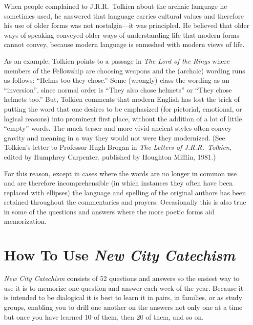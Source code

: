 \documentclass[]{memoir}
\begin{document}
When people complained to J.R.R.\ Tolkien about the archaic language he sometimes used, he answered that language carries cultural values and therefore his use of older forms was not nostalgia\thinspace{}---\thinspace{}it was principled. He believed that older ways of speaking conveyed older ways of understanding life that modern forms cannot convey, because modern language is enmeshed with modern views of life.

As an example, Tolkien points to a passage in \emph{The Lord of the Rings}\/ where members of the Fellowship are choosing weapons and the (archaic) wording runs as follows: ``Helms too they chose.'' Some (wrongly) class the wording as an ``inversion'', since normal order is ``They also chose helmets'' or ``They chose helmets too.'' But, Tolkien comments that modern English has lost the trick of putting the word that one desires to be emphasized (for pictorial, emotional, or logical reasons) into prominent first place, without the addition of a lot of little ``empty'' words. The much terser and more vivid ancient styles often convey gravity and meaning in a way they would not were they modernized. (See Tolkien's letter to Professor Hugh Brogan in \emph{The Letters of J.R.R.\ Tolkien}, edited by Humphrey Carpenter, published by Houghton Mifflin, 1981.)

For this reason, except in cases where the words are no longer in common use and are therefore incomprehensible (in which instances they often have been replaced with ellipses) the language and spelling of the original authors has been retained throughout the commentaries and prayers. Occasionally this is also true in some of the questions and answers where the more poetic forms aid memorization.


\section{How To Use \emph{New City Catechism}}
\emph{New City Catechism}\/ consists of 52 questions and answers so the easiest way to use it is to memorize one question and answer each week of the year. Because it is intended to be dialogical it is best to learn it in pairs, in families, or as study groups, enabling you to drill one another on the answers not only one at a time but once you have learned 10 of them, then 20 of them, and so on.
\end{document}
